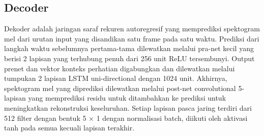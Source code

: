 \subsection{Decoder}
Dekoder adalah jaringan saraf rekuren autoregresif yang memprediksi spektogram mel dari urutan input yang disandikan satu frame pada satu waktu. Prediksi dari langkah waktu sebelumnya pertama-tama dilewatkan melalui pra-net kecil yang berisi 2 lapisan yang terhubung penuh dari 256 unit ReLU tersembunyi. Output prenet dan vektor konteks perhatian digabungkan dan dilewatkan melalui tumpukan 2 lapisan LSTM uni-directional dengan 1024 unit. Akhirnya, spektogram mel yang diprediksi dilewatkan melalui post-net convolutional 5-lapisan yang memprediksi residu untuk ditambahkan ke prediksi untuk meningkatkan rekonstruksi keseluruhan. Setiap lapisan pasca jaring terdiri dari 512 filter dengan bentuk 5 × 1 dengan normalisasi batch, diikuti oleh aktivasi tanh pada semua kecuali lapisan terakhir.

